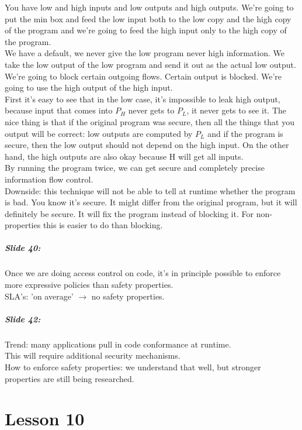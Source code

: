 \documentclass[10pt,a4paper]{report}
\begin{document}
You have low and high inputs and low outputs and high outputs. We're going to put the min box and feed the low input both to the low copy and the high copy of the program and we're going to feed the high input only to the high copy of the program.\\
We have a default, we never give the low program never high information. We take the low output of the low program and send it out as the actual low output. We're going to block certain outgoing flows. Certain output is blocked. We're going to use the high output of the high input.\\
First it's easy to see that in the low case, it's impossible to leak high output, because input that comes into $P_{H}$ never gets to $P_{L}$, it never gets to see it. The nice thing is that if the original program was secure, then all the things that you output will be correct: low outputs are computed by $P_{L}$ and if the program is secure, then the low output should not depend on the high input. On the other hand, the high outputs are also okay because H will get all inputs.\\
By running the program twice, we can get secure and completely precise information flow control.\\
Downside: this technique will not be able to tell at runtime whether the program is bad. You know it's secure. It might differ from the original program, but it will definitely be secure. It will fix the program instead of blocking it. For non-properties this is easier to do than blocking.

\paragraph{Slide 40:} Once we are doing access control on code, it's in principle possible to enforce more expressive policies than safety properties.\\
SLA's: 'on average' $\rightarrow$ no safety properties.

\paragraph{Slide 42:} Trend: many applications pull in code conformance at runtime. \\
This will require additional security mechanisms.\\
How to enforce safety properties: we understand that well, but stronger properties are still being researched.

\chapter{Lesson 10}
\end{document}
